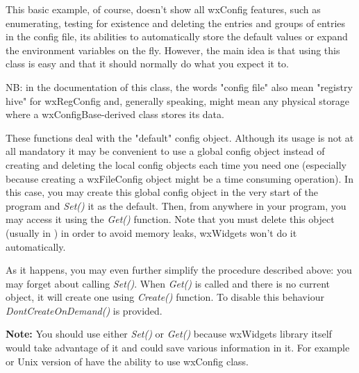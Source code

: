 This basic example, of course, doesn't show all wxConfig features, such as
enumerating, testing for existence and deleting the entries and groups of
entries in the config file, its abilities to automatically store the default
values or expand the environment variables on the fly. However, the main idea
is that using this class is easy and that it should normally do what you
expect it to.

NB: in the documentation of this class, the words "config file" also mean
"registry hive" for wxRegConfig and, generally speaking, might mean any
physical storage where a wxConfigBase-derived class stores its data.



\label{wxconfigstaticfunctions}

These functions deal with the "default" config object. Although its usage is
not at all mandatory it may be convenient to use a global config object
instead of creating and deleting the local config objects each time you need
one (especially because creating a wxFileConfig object might be a time
consuming operation). In this case, you may create this global config object
in the very start of the program and {\it Set()} it as the default. Then, from
anywhere in your program, you may access it using the {\it Get()} function.
Note that you must delete this object (usually in ) 
in order to avoid memory leaks, wxWidgets won't do it automatically.

As it happens, you may even further simplify the procedure described above:
you may forget about calling {\it Set()}. When {\it Get()} is called and there
is no current object, it will create one using {\it Create()} function. To
disable this behaviour {\it DontCreateOnDemand()} is provided.

{\bf Note:} You should use either {\it Set()} or {\it Get()} because wxWidgets
library itself would take advantage of it and could save various information
in it. For example  or Unix version
of  have the ability to use wxConfig class.

\\
\\
\\



